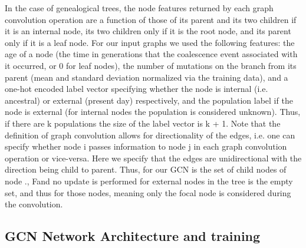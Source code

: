 In the case of genealogical trees, the node features returned by each graph convolution operation are a function of those of its parent and its two children if it is an internal node, its two children only if it is the root node, and its parent only if it is a leaf node. For our input graphs we used the following features: the age of a node (the time in generations that the coalescence event associated with it occurred, or 0 for leaf nodes), the number of mutations on the branch from its parent (mean and standard deviation normalized via the training data), and a one-hot encoded label vector specifying whether the node is internal (i.e. ancestral) or external (present day) respectively, and the population label if the node is external (for internal nodes the population is considered unknown). Thus, if there are k populations the size of the label vector is k + 1. Note that the definition of graph convolution allows for directionality of the edges, i.e. one can specify whether node i passes information to node j in each graph convolution operation or vice-versa. Here we specify that the edges are unidirectional with the direction being child to parent. Thus, for our GCN   is the set of child nodes of node  ., Fand no update is performed for external nodes in the tree   is the empty set, and thus for those nodes, meaning only the focal node is considered during the convolution. 

\subsection{GCN Network Architecture and training}
 
